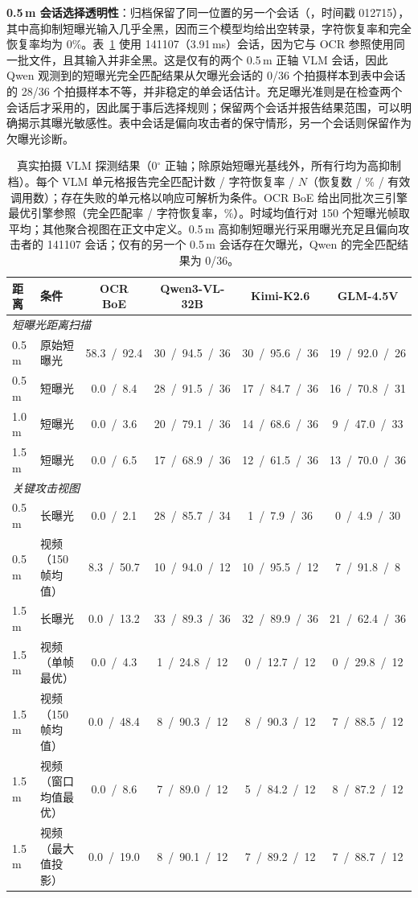 \textbf{0.5\,m 会话选择透明性}：归档保留了同一位置的另一个会话（，时间戳 012715），其中高抑制短曝光输入几乎全黑，因而三个模型均给出空转录，字符恢复率和完全恢复率均为 0\%。表~\ref{tab:real_vlm} 使用 141107（3.91\,ms）会话，因为它与 OCR 参照使用同一批文件，且其输入并非全黑。这是仅有的两个 0.5\,m 正轴 VLM 会话，因此 Qwen 观测到的短曝光完全匹配结果从欠曝光会话的 0/36 个拍摄样本到表中会话的 28/36 个拍摄样本不等，并非稳定的单会话估计。充足曝光准则是在检查两个会话后才采用的，因此属于事后选择规则；保留两个会话并报告结果范围，可以明确揭示其曝光敏感性。表中会话是偏向攻击者的保守情形，另一个会话则保留作为欠曝光诊断。

\begin{table}[!t]
\caption{真实拍摄 VLM 探测结果（0$^{\circ}$ 正轴；除原始短曝光基线外，所有行均为高抑制档）。每个 VLM 单元格报告完全匹配计数 / 字符恢复率 / $N$（恢复数 / \% / 有效调用数）；存在失败的单元格以响应可解析为条件。OCR BoE 给出同批次三引擎最优引擎参照（完全匹配率 / 字符恢复率，\%）。时域均值行对 150 个短曝光帧取平均；其他聚合视图在正文中定义。0.5\,m 高抑制短曝光行采用曝光充足且偏向攻击者的 141107 会话；仅有的另一个 0.5\,m 会话存在欠曝光，Qwen 的完全匹配结果为 0/36。}
\label{tab:real_vlm}
\centering
\footnotesize
\setlength{\tabcolsep}{4.2pt}
\begin{tabular}{llcccc}
\toprule
距离 & 条件 & OCR BoE & Qwen3-VL-32B & Kimi-K2.6 & GLM-4.5V \\
\midrule
\multicolumn{6}{l}{\textit{短曝光距离扫描}}\\
\midrule
0.5\,m & 原始短曝光 & 58.3~/~92.4 & 30~/~94.5~/~36 & 30~/~95.6~/~36 & 19~/~92.0~/~26 \\
0.5\,m & 短曝光 & 0.0~/~8.4 & 28~/~91.5~/~36 & 17~/~84.7~/~36 & 16~/~70.8~/~31 \\
1.0\,m & 短曝光 & 0.0~/~3.6 & 20~/~79.1~/~36 & 14~/~68.6~/~36 & 9~/~47.0~/~33 \\
1.5\,m & 短曝光 & 0.0~/~6.5 & 17~/~68.9~/~36 & 12~/~61.5~/~36 & 13~/~70.0~/~36 \\
\midrule
\multicolumn{6}{l}{\textit{关键攻击视图}}\\
\midrule
0.5\,m & 长曝光 & 0.0~/~2.1 & 28~/~85.7~/~34 & 1~/~7.9~/~36 & 0~/~4.9~/~30 \\
0.5\,m & 视频（150 帧均值） & 8.3~/~50.7 & 10~/~94.0~/~12 & 10~/~95.5~/~12 & 7~/~91.8~/~8 \\
1.5\,m & 长曝光 & 0.0~/~13.2 & 33~/~89.3~/~36 & 32~/~89.9~/~36 & 21~/~62.4~/~36 \\
1.5\,m & 视频（单帧最优） & 0.0~/~4.3 & 1~/~24.8~/~12 & 0~/~12.7~/~12 & 0~/~29.8~/~12 \\
1.5\,m & 视频（150 帧均值） & 0.0~/~48.4 & 8~/~90.3~/~12 & 8~/~90.3~/~12 & 7~/~88.5~/~12 \\
1.5\,m & 视频（窗口均值最优） & 0.0~/~8.6 & 7~/~89.0~/~12 & 5~/~84.2~/~12 & 8~/~87.2~/~12 \\
1.5\,m & 视频（最大值投影） & 0.0~/~19.0 & 8~/~90.1~/~12 & 7~/~89.2~/~12 & 7~/~88.7~/~12 \\
\bottomrule
\end{tabular}
\end{table}

